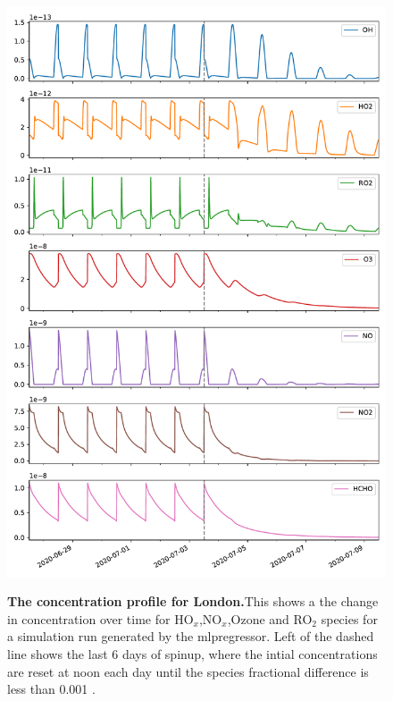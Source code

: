 \begin{figure}[H]
    \centering
\includegraphics[width=.9\textwidth]{figures_c3/mlpregressor/conc_clfo.pdf}
\label{fig:clondon}
\caption{\textbf{The concentration profile for London.}This shows a the change in concentration over time for HO$_x$,NO$_x$,Ozone and RO$_2$ species for a simulation run generated by the mlpregressor. Left of the dashed line shows the last 6 days of spinup, where the intial concentrations are reset at noon each day until the species fractional difference is less than 0.001 .}
\end{figure}

\newpage


